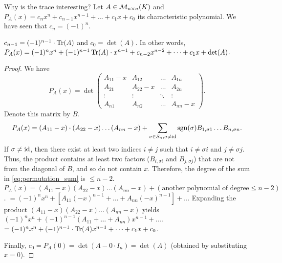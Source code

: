 Why is the trace interesting?
Let $A \in \mathcal{M}_{n \times n}(K)$ and $P_A(x) = c_n x^n + c_{n-1} x^{n-1} + \dots + c_1 x + c_0$ its characteristic polynomial. We have seen that $c_n = (-1)^n$.

\begin{lemma}\label{lem:char_poly_coeffs}
  $c_{n-1} = (-1)^{n-1} \cdot \operatorname{Tr}(A)$ and $c_0 = \det(A)$. In other words, $P_A(x) = (-1)^n x^n + (-1)^{n-1}\operatorname{Tr}(A) \cdot x^{n-1} + c_{n-2}x^{n-2} + \dots + c_1 x + \det(A)$.
\end{lemma}

\begin{proof}
  We have
  \[
  P_A(x) = \det\begin{pmatrix} A_{11}-x & A_{12} & \dots & A_{1n} \\ A_{21} & A_{22}-x & \dots & A_{2n} \\ \vdots & \vdots & \ddots & \vdots \\ A_{n1} & A_{n2} & \dots & A_{nn}-x \end{pmatrix}.
  \]
  Denote this matrix by $B$.
  \begin{equation} \label{eq:permutation_sum}
    P_A(x) = (A_{11}-x) \cdot (A_{22}-x) \dots (A_{nn}-x) + \sum_{\sigma \in S_n, \sigma \ne \operatorname{id}} \operatorname{sgn}(\sigma) B_{1, \sigma 1} \dots B_{n, \sigma n}.
  \end{equation}
  If $\sigma \ne \operatorname{id}$, then there exist at least two indices $i \ne j$ such that $i \ne \sigma i$ and $j \ne \sigma j$.
  Thus, the product contains at least two factors ($B_{i, \sigma i}$ and $B_{j, \sigma j}$) that are not from the diagonal of $B$, and so do not contain $x$.
  Therefore, the degree of the sum in \eqref{eq:permutation_sum} is $\le n-2$.
  $P_A(x) = (A_{11}-x)(A_{22}-x) \dots (A_{nn}-x) + (\text{another polynomial of degree} \le n-2)$.
  $= (-1)^n x^n + \left[ A_{11}(-x)^{n-1} + \dots + A_{nn}(-x)^{n-1} \right] + \dots$
  Expanding the product $(A_{11}-x)(A_{22}-x) \dots (A_{nn}-x)$ yields $(-1)^n x^n + (-1)^{n-1}(A_{11} + \dots + A_{nn})x^{n-1} + \dots$.
  $= (-1)^n x^n + (-1)^{n-1} \cdot \operatorname{Tr}(A)x^{n-1} + \dots + c_1 x + c_0$.

  Finally, $c_0 = P_A(0) = \det(A - 0 \cdot I_n) = \det(A)$ (obtained by substituting $x=0$).
\end{proof}

